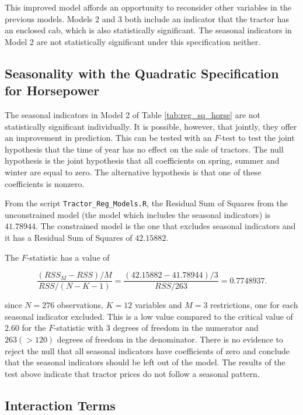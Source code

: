 \documentclass[11pt]{paper}
\begin{document}
This improved model affords an opportunity
to reconsider other variables in the previous models.
Models 2 and 3 both include an indicator that the
tractor has an enclosed cab, 
which is also statistically significant. 
The seasonal indicators in Model 2 are not statistically significant under this specification neither. 

\clearpage
\subsection{Seasonality with the Quadratic Specification for Horsepower}


The seasonal indicators in Model 2 
of Table \ref{tab:reg_sq_horse}
are not statistically significant individually.
It is possible, however, that jointly, they 
offer an improvement in prediction. 
This can be tested with an $F$-test
to test the joint hypothesis that the time of year has no effect on the sale of tractors. 
%
The null hypothesis is the joint hypothesis that all coefficients on spring, summer and winter are equal to zero. 
The alternative hypothesis is that one of these coefficients is nonzero. 
% 

From the script \texttt{Tractor\_Reg\_Models.R}, the Residual Sum of Squares from the unconstrained model (the model which includes the seasonal indicators) is $41.78944$. 
The constrained model is the one that excludes seasonal indicators and it has a Residual Sum of Squares of $42.15882$.

The $F$-statistic has a value of 

$$ 
\frac{(RSS_M - RSS)/M}{RSS/(N - K - 1)} = \frac{(42.15882 - 41.78944)/3}{RSS/263} = 0.7748937. 
$$

since $N = 276$ observations, $K = 12$ variables and $M = 3$ restrictions, one for each seasonal indicator excluded. 
This is a low value compared to the critical value of $2.60$ for the $F$-statistic with $3$ degrees of freedom in the numerator and $263 (> 120)$ degrees of freedom in the denominator. 
There is no evidence to reject the null that all seasonal indicators have coefficients of zero and conclude that the seasonal indicators should be left out of the model. 
%
The results of the test above indicate that tractor prices do not follow a seasonal pattern. 


\clearpage
\subsection{Interaction Terms}
\end{document}
